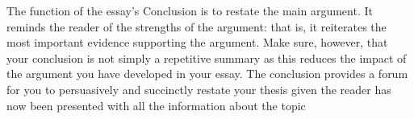 The function of the essay's Conclusion is to restate the main argument. It reminds the reader of the strengths of the argument: that is, it reiterates the most important evidence supporting the argument. Make sure, however, that your conclusion is not simply a repetitive summary as this reduces the impact of the argument you have developed in your essay. The conclusion provides a forum for you to persuasively and succinctly restate your thesis given the reader has now been presented with all the information about the topic